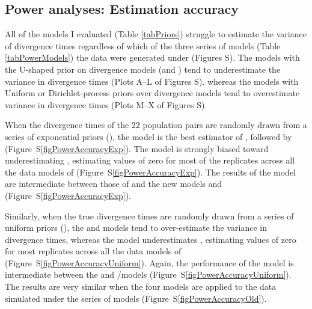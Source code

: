 \subsection{Power analyses: Estimation accuracy}
All of the models I evaluated (Table \ref{tabPriors}) struggle to estimate the
variance of divergence times \divTimeDispersion regardless of which of the
three series of models (Table \ref{tabPowerModels}) the data were generated
under
(Figures
S).
The models with the U-shaped prior on divergence models (\modelOld and
\modelUshaped) tend to underestimate the variance in divergence times 
(Plots A--L of Figures
S).
whereas the models with Uniform or Dirichlet-process priors over divergence
models tend to overestimate variance in divergence times
(Plots M--X of Figures
S).

When the divergence times of the 22 population pairs are randomly drawn from a
series of exponential priors (\powerSeriesExp), the \modelDPP model is the
best estimator of \divTimeDispersion, followed by \modelUniform
(Figure~S\ref{figPowerAccuracyExp}).
The \modelOld model is strongly biased toward underestimating
\divTimeDispersion, estimating values of zero for most of the replicates across
all the data models of \powerSeriesExp (Figure~S\ref{figPowerAccuracyExp}).
The results of the \modelUshaped model are intermediate between those of
\modelOld and the new models \modelDPP and \modelUniform
(Figure~S\ref{figPowerAccuracyExp}).

Similarly, when the true divergence times are randomly drawn from a series of
uniform priors (\powerSeriesUniform), the \modelDPP and \modelUniform models
tend to over-estimate the variance in divergence times, whereas the \modelOld
model underestimates \divTimeDispersion, estimating values of zero for most
replicates across all the data models of \powerSeriesUniform
(Figure~S\ref{figPowerAccuracyUniform}).
Again, the performance of the \modelUshaped model is intermediate between the
\modelOld and \modelDPP/\modelUniform models (Figure~S\ref{figPowerAccuracyUniform}).
The results are very similar when the four models are applied to the data
simulated under the \powerSeriesOld series of models
(Figure~S\ref{figPowerAccuracyOld}).

